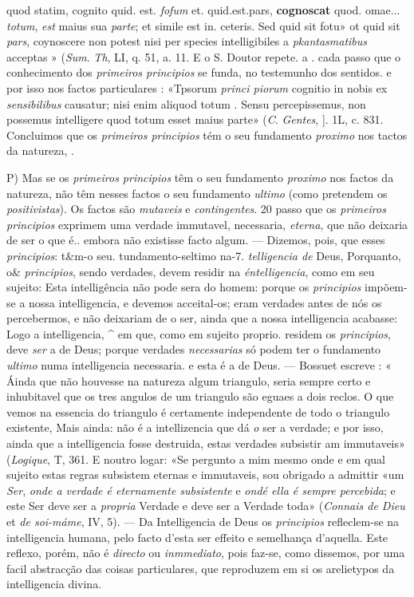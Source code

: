 quod statim, cognito quid. est. \emph{fofum} et. quid.est.pars, \textbf{cognoscat} quod. omae... \emph{totum}, \emph{est} maius sua \emph{parte}; et simile est in. ceteris. Sed quid sit fotu» ot quid sit \emph{pars}, coynoscere non potest nisi per species intelligibiles a \emph{pkantasmatibus} acceptas » (\emph{Sum}. \emph{Th}, LI, q. 51, a. 11. E o S. Doutor repete. a . cada passo que o conhecimento dos \emph{primeiros principios} se funda, no testemunho dos sentidos. e por isso nos factos particulares : «Tpsorum \emph{princi piorum} cognitio in nobis ex \emph{sensibilibus} causatur; nisi enim aliquod totum . Sensu percepissemus, non possemus intelligere quod totum esset maius parte» (\emph{C}. \emph{Gentes}, ]. 1L, c. 831. Concluimos que os \emph{primeiros principios} tém o seu fundamento \emph{proximo} nos tactos da natureza, .

P) Mas se os \emph{primeiros principios} têm o seu fundamento \emph{proximo} nos factos da natureza, não têm nesses factos o seu fundamento \emph{ultimo} (como pretendem os \emph{positivistas}). Os factos são \emph{mutaveis} e \emph{contingentes}. 20 passo que os \emph{primeiros principios} exprimem uma verdade immutavel, necessaria, \emph{eterna}, que não deixaria de ser o que é.. embora não existisse facto algum. --- Dizemos, pois, que esses \emph{principios}: t\&m-o seu. tundamento-seltimo na-7. \emph{telligencia de} Deus, Porquanto, o\& \emph{principios}, sendo verdades, devem residir na \emph{éntelligencia}, como em seu sujeito: Esta intelligência não pode sera do homem: porque os \emph{principios} impõem-se a nossa intelligencia, e devemos acceital-os; eram verdades antes de nós os percebermos, e não deixariam de o ser, ainda que a nossa intelligencia acabasse: Logo a intelligencia, \textasciicircum{} em que, como em sujeito proprio. residem os \emph{principios}, deve \emph{ser} a de Deus; porque verdades \emph{necessarias} só podem ter o fundamento \emph{ultimo} numa intelligencia necessaria. e esta é a de Deus. --- Bossuet escreve : « Áinda que não houvesse na natureza algum triangulo, seria sempre certo e inhubitavel que os tres angulos de um triangulo são eguaes a dois reclos. O que vemos na essencia do triangulo é certamente independente de todo o triangulo existente, Mais ainda: não é a intellizencia que dá \emph{o} ser a verdade; e por isso, ainda que a intelligencia fosse destruida, estas verdades subsistir am immutaveis» (\emph{Logique}, T, 361. E noutro logar: «Se pergunto a mim mesmo onde e em qual sujeito estas regras subsistem eternas e immutaveis, sou obrigado a admittir «um \emph{Ser}, \emph{onde a verdade é eternamente subsistente} e \emph{ondé ella é sempre percebida}; e este Ser deve ser a \emph{propria} Verdade e deve ser a Verdade toda» (\emph{Connais de Dieu} et \emph{de soi-máme}, IV, 5). --- Da Intelligencia de Deus os \emph{principios} refleclem-se na intelligencia humana, pelo facto d'esta ser effeito e semelhança d'aquella. Este reflexo, porém, não é \emph{directo} ou \emph{inmmediato}, pois faz-se, como dissemos, por uma facil abstracção das coisas particulares, que reproduzem em si os arelietypos da intelligencia divina.

